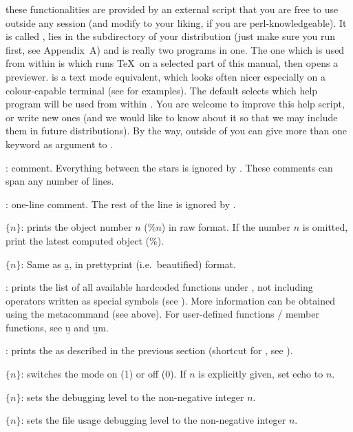  these functionalities are provided by an
external  script that you are free to use outside any  session
(and modify to your liking, if you are perl-knowledgeable). It is called
, lies in the  subdirectory of your distribution
(just make sure you run  first, see Appendix~A) and is
really two programs in one. The one which is used from within  is
 which runs \TeX\ on a selected part of this manual, then opens
a previewer.  is a text mode equivalent, which looks
often nicer especially on a colour-capable terminal (see
 for examples). The default  selects which
help program will be used from within . You are welcome to improve this
help script, or write new ones (and we would like to know about it
so that we may include them in future distributions). By the way, outside
of  you can give more than one keyword as argument to .

: comment. Everything between the stars is ignored by
. These comments can span any number of lines.

\subseckbd{\bs\bs}: one-line comment. The rest of the line
is ignored by .

 $\{n\}$: prints the object number $n$ ($\%n$)
in raw format. If the number $n$ is omitted, print the latest computed object
($\%$). \label{se:history}

 $\{n\}$: Same as \b{a}, in prettyprint (i.e.~beautified)
format.

: prints the list of all available
hardcoded functions under , not including operators written as special
symbols (see ). More information can be obtained using
the  metacommand (see above). For user-defined functions / member
functions, see \b{u} and \b{um}.

: prints the  as described in the
previous section (shortcut for , see ).

 $\{n\}$: switches the  mode on (1) or off (0). If
$n$ is explicitly given, set echo to $n$.

 $\{n\}$: sets the debugging level  to the
non-negative integer $n$.

 $\{n\}$: sets the file usage debugging level 
to the non-negative integer $n$.

